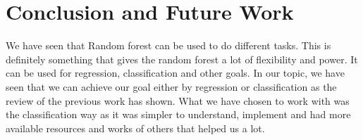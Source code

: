 \chapter{Conclusion and Future Work}
\label{chap:Five}

We have seen that Random forest can be used to do different tasks. This is definitely something that gives the random forest a lot of flexibility and power. It can be used for regression, classification and other goals. In our topic, we have seen that we can achieve our goal either by regression or classification as the review of the previous work has shown. What we have chosen to work with was the classification way as it was simpler to understand, implement and had more available resources and works of others that helped us a lot. \par
